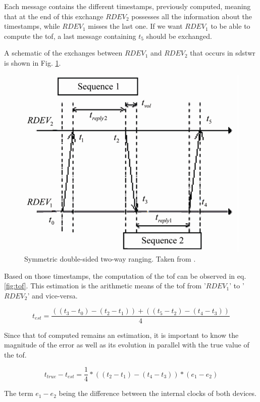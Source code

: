 Each message contains the different timestamps, previously computed, meaning that at the end of this exchange $RDEV_2$ possesses all the information about the timestamps, while $RDEV_1$ misses the last one. If we want $RDEV_1$ to be able to compute the \gls{tof}, a last message containing $t_5$ should be exchanged.
\vspace{2mm}

A schematic of the exchanges between $RDEV_1$ and $RDEV_2$ that occurs in \gls{sdstwr} is shown in Fig. \ref{sdstwr}. 

\begin{figure}[H]
\centering
\includegraphics[width=.6\linewidth]{Images/sds-twr.png}
\caption{Symmetric double-sided two-way ranging. Taken from \cite{dalce2011comparison}.}
\label{sdstwr}
\end{figure}

Based on those timestamps, the computation of the \gls{tof} can be observed in eq. \ref{fig:tof}. This estimation is the arithmetic means of the \gls{tof} from '$RDEV_1$' to '$RDEV_2$' and vice-versa.

\begin{equation}
	t_{est} = \frac{((t_3 - t_0) - (t_2 - t_1)) + ((t_5 - t_2) - (t_4 - t_3))}{4}
\label{fig:tof}
\end{equation}

Since that \gls{tof} computed remains an estimation, it is important to know the magnitude of the error as well as its evolution in parallel with the true value of the \gls{tof}.

\begin{equation}
	t_{true} - t_{est} = \frac{1}{4}*((t_2 - t_1) - (t_4 - t_3))*(e_1 - e_2)
\end{equation}

The term $e_1 - e_2$ being the difference between the internal clocks of both devices. \cite{dalce2011comparison}


